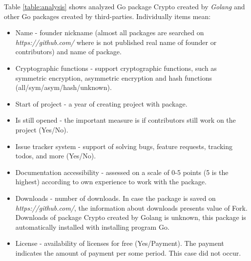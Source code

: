 \documentclass[
  digital, %
  notable,   %
  lof,     %
  lot,     %
]{fithesis3}
\begin{document}
Table \ref{table:analysis} shows analyzed Go package Crypto created by \textit{Golang} and other Go 
packages created by third-parties. Individually items mean:
\vskip0.1in
\begin{itemize}[leftmargin=2em,rightmargin=1em,itemsep=0.75\parskip,parsep=0em,topsep=0em,partopsep=0em]
\item Name - founder nickname (almost all packages are searched on \textit{https://github.com/} where is not published real name of founder or contributors) and name of package.
\item Cryptographic functions - support cryptographic functions, such as symmetric encryption, asymmetric encryption and hash functions (all/sym/asym/hash/unknown).
\item Start of project - a year of creating project with package.
\item Is still opened - the important measure is if contributors still work on the project (Yes/No).
\item Issue tracker system - support of solving bugs, feature requests, tracking todos, and more (Yes/No).
\item Documentation accessibility - assessed on a scale of 0-5 points (5 is the highest) according to own experience to work with the package.
\item Downloads - number of downloads. In case the package is saved on \textit{https://github.com/}, the information about downloads presents value of Fork. Downloads of package Crypto created by Golang is unknown, this package is automatically installed with installing program Go.  
\item License - availability of licenses for free (Yes/Payment). The payment indicates the amount of payment per some period. This case did not occur.
\end{itemize}
\vskip0.1in
\end{document}

